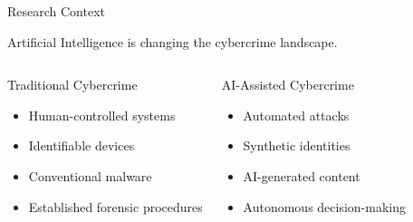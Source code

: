 \documentclass[aspectratio=169,11pt]{beamer}
\begin{document}
	\begin{frame}{Research Context}
		
		Artificial Intelligence is changing the cybercrime
		landscape.
		
		\vspace{0.4cm}
		
		\begin{columns}[T]
			
			
			\begin{block}{Traditional Cybercrime}
				
				\begin{itemize}
					
					\item Human-controlled systems
					
					\item Identifiable devices
					
					\item Conventional malware
					
					\item Established forensic procedures
					
				\end{itemize}
				
			\end{block}
			
			
			\begin{block}{AI-Assisted Cybercrime}
				
				\begin{itemize}
					
					\item Automated attacks
					
					\item Synthetic identities
					
					\item AI-generated content
					
					\item Autonomous decision-making
					
				\end{itemize}
				
			\end{block}
			
		\end{columns}
		
	\end{frame}
	
	
\end{document}
